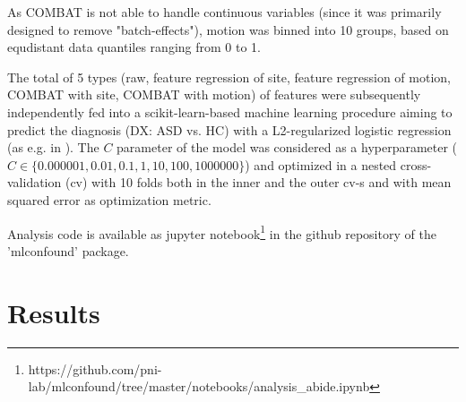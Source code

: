 \documentclass{article}
\begin{document}
As COMBAT is not able to handle continuous variables (since it was primarily designed to remove "batch-effects"), motion was binned into 10 groups, based on equdistant data quantiles ranging from 0 to 1.

The total of 5 types (raw, feature regression of site, feature regression of motion, COMBAT with site, COMBAT with motion) of features were subsequently independently fed into a scikit-learn-based \citep{pedregosa2011scikit} machine learning procedure aiming to predict the diagnosis (DX: ASD vs. HC) with a L2-regularized logistic regression (as e.g. in \citep{dadi2019benchmarking}). The $C$ parameter of the model was considered as a hyperparameter ($C \in \{0.000001, 0.01, 0.1, 1, 10, 100, 1000000\}$) and optimized in a nested cross-validation (cv) with 10 folds both in the inner and the outer cv-s and with mean squared error as optimization metric.

Analysis code is available as jupyter notebook\footnote{https://github.com/pni-lab/mlconfound/tree/master/notebooks/analysis\_abide.ipynb} in the github repository of the 'mlconfound' package.

\section{Results}
\end{document}
